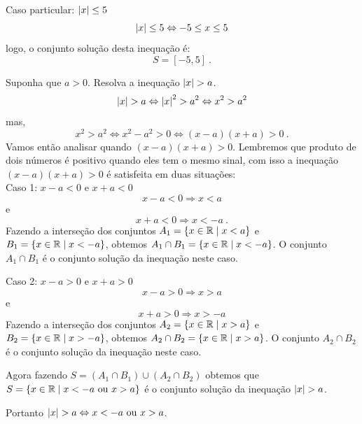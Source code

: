 \begin{exem}
   Caso particular: $\left|x\right| \leq 5$
\begin{equation}
\left|x\right| \leq 5 \Leftrightarrow -5 \leq x \leq 5
\end{equation}
   logo, o conjunto solução desta inequação é:
\begin{equation}
S= [-5, 5] \ . 
\end{equation}
\end{exem}

\begin{exem}
   Suponha que $a> 0$. Resolva a inequação $\left|x\right| > a$.
\begin{equation}
\left|x\right| > a \Leftrightarrow \left|x\right|^2 > a^2 \Leftrightarrow x^2 > a^2
\end{equation}
   mas,
\begin{equation}
x^2 > a^2 \Leftrightarrow x^2 - a^2 > 0 \Leftrightarrow (x-a)(x+a) > 0 \ .
\end{equation}
   Vamos então analisar quando $(x-a)(x+a) > 0$. Lembremos que produto de dois números é positivo quando eles tem o mesmo sinal, com isso a inequação $(x-a)(x+a) > 0$ é satisfeita em duas situações:\\
   Caso 1: $x-a< 0$ e $x+a< 0$
\begin{equation}
x-a< 0 \Rightarrow x< a
\end{equation}
   e
\begin{equation}
x+a< 0 \Rightarrow x< -a \ .
\end{equation}
  Fazendo a interseção dos conjuntos $A_1= \left\{ x \in \mathbb{R} \mid x<a \right\}$ e $B_1= \left\{ x \in \mathbb{R} \mid x< -a \right\}$, obtemos $A_1 \cap B_1= \left\{ x \in \mathbb{R} \mid x< -a \right\}$. O conjunto $A_1 \cap B_1$ é o conjunto solução da inequação neste caso.


   Caso 2: $x-a> 0$ e $x+a> 0$
\begin{equation}
x-a> 0 \Rightarrow x> a
\end{equation}
   e
\begin{equation}
x+a> 0 \Rightarrow x> -a 
\end{equation}
   Fazendo a interseção dos conjuntos $A_2= \left\{ x \in \mathbb{R} \mid x> a \right\}$ e $B_2= \left\{ x \in \mathbb{R} \mid x> -a \right\}$, obtemos $A_2 \cap B_2= \left\{ x \in \mathbb{R} \mid x> a \right\}$. O conjunto $A_2 \cap B_2$ é o conjunto solução da inequação neste caso.

   Agora fazendo $S= (A_1 \cap B_1) \cup (A_2 \cap B_2)$ obtemos que $S= \left\{ x \in \mathbb{R} \mid x<-a \text{ ou } x> a \right\}$ é o conjunto solução da inequação $\left|x\right| > a$.

  Portanto $\left|x\right| > a \Leftrightarrow x<-a \text{ ou } x> a$.
\end{exem}

